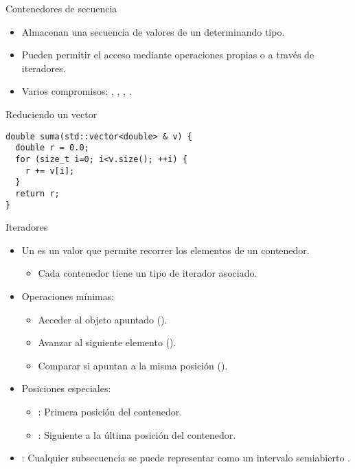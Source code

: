 \begin{frame}[t,fragile]{Contenedores de secuencia}
\begin{itemize}
  \item Almacenan una secuencia de valores de un determinando tipo.
  \item Pueden permitir el acceso mediante operaciones propias o
        a través de iteradores.
  \item Varios compromisos: , , , .
\end{itemize}
\begin{block}{Reduciendo un vector}
\begin{lstlisting}
double suma(std::vector<double> & v) {
  double r = 0.0;
  for (size_t i=0; i<v.size(); ++i) {
    r += v[i];
  }
  return r;
}
\end{lstlisting}
\end{block}
\end{frame}

\begin{frame}[t,fragile]{Iteradores}
\begin{itemize}
  \item Un  es un valor que permite recorrer los elementos
        de un contenedor.
    \begin{itemize}
      \item Cada contenedor tiene un tipo de iterador asociado.
    \end{itemize}

  \vfill\pause
  \item Operaciones mínimas:
    \begin{itemize}
      \item Acceder al objeto apuntado ().
      \item Avanzar al siguiente elemento ().
      \item Comparar si apuntan a la misma posición ().
    \end{itemize}

  \vfill\pause
  \item Posiciones especiales:
    \begin{itemize}
      \item {}: Primera posición del contenedor.
      \item {}: Siguiente a la última posición del contenedor.
    \end{itemize}
  \vfill
  \item {}: Cualquier subsecuencia se puede representar
        como un intervalo semiabierto \cppid{[i,j)}.
\end{itemize}
\end{frame}

